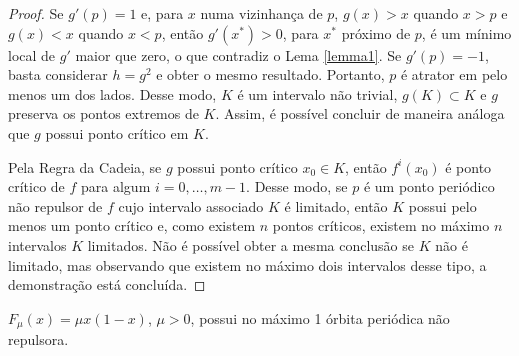 \begin{proof}
Se $g'(p) = 1$ e, para $x$ numa vizinhança de $p$, $g(x) > x$ quando $x > p$ e $g(x) < x$ quando $x < p$, então $g'(x^*) > 0$, para $x^*$ próximo de $p$, é um mínimo local de $g'$ maior que zero, o que contradiz o Lema \ref{lemma1}. Se $g'(p)=-1$, basta considerar $h=g^2$ e obter o mesmo resultado. Portanto, $p$ é atrator em pelo menos um dos lados. Desse modo, $K$ é um intervalo não trivial, $g(K) \subset K$ e $g$ preserva os pontos extremos de $K$. Assim, é possível concluir de maneira análoga que $g$ possui ponto crítico em $K$.

Pela Regra da Cadeia, se $g$ possui ponto crítico $x_0 \in K$, então $f^i(x_0)$ é ponto crítico de $f$ para algum $i = 0, \dots, m-1$. Desse modo, se $p$ é um ponto periódico não repulsor de $f$ cujo intervalo associado $K$ é limitado, então $K$ possui pelo menos um ponto crítico e, como existem $n$ pontos críticos, existem no máximo $n$ intervalos $K$ limitados. Não é possível obter a mesma conclusão se $K$ não é limitado, mas observando que existem no máximo dois intervalos desse tipo, a demonstração está concluída.
\end{proof}

\begin{corollary}
$F_\mu(x) = \mu x(1-x)$, $\mu > 0$, possui no máximo 1 órbita periódica não repulsora.
\end{corollary}
